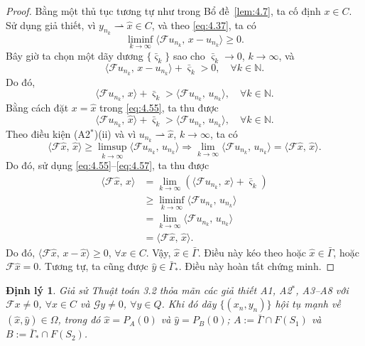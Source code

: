 \documentclass[11pt,a4paper]{article}
\theoremstyle{plain}
\newtheorem{theorem}{Định lý}[section]
\theoremstyle{definition}
\theoremstyle{remark}
\numberwithin{equation}{section}
\newcommand{\Fc}{\mathcal{F}}
\newcommand{\Gc}{\mathcal{G}}
\newcommand{\inp}[2]{\langle #1,\,#2\rangle}
\newcommand{\wto}{\rightharpoonup}
\newcommand{\N}{\mathbb{N}}
\newcommand{\Gam}{\bar{\Gamma}}
\newcommand{\Gams}{\bar{\Gamma}_{*}}
\newcommand{\Fix}[1]{F(#1)}
\begin{document}
\begin{proof}
Bằng một thủ tục tương tự như trong Bổ đề~\ref{lem:4.7}, ta cố định $x\in C$. Sử dụng giả thiết, vì $y_{n_k}\wto\hat{x}\in C$, và theo \eqref{eq:4.37}, ta có
\[
\liminf_{k\to\infty}\inp{\Fc u_{n_k}}{x-u_{n_k}}\ge 0.
\]
Bây giờ ta chọn một dãy dương $\{\bar{\varsigma}_k\}$ sao cho $\bar{\varsigma}_k\to 0$, $k\to\infty$, và
\[
\inp{\Fc u_{n_k}}{x-u_{n_k}}+\bar{\varsigma}_k>0,\quad\forall k\in\N.
\]
Do đó,
\begin{equation}
\inp{\Fc u_{n_k}}{x}+\bar{\varsigma}_k>\inp{\Fc u_{n_k}}{u_{n_k}},\quad\forall k\in\N. \label{eq:4.55}
\end{equation}
Bằng cách đặt $x=\hat{x}$ trong \eqref{eq:4.55}, ta thu được
\begin{equation}
\inp{\Fc u_{n_k}}{\hat{x}}+\bar{\varsigma}_k>\inp{\Fc u_{n_k}}{u_{n_k}},\quad\forall k\in\N. \label{eq:4.56}
\end{equation}
Theo điều kiện (A2$^{*}$)(ii) và vì $u_{n_k}\wto\hat{x}$, $k\to\infty$, ta có
\begin{equation}
\inp{\Fc\hat{x}}{\hat{x}}\ge\limsup_{k\to\infty}\inp{\Fc u_{n_k}}{u_{n_k}}\Longrightarrow\lim_{k\to\infty}\inp{\Fc u_{n_k}}{u_{n_k}}=\inp{\Fc\hat{x}}{\hat{x}}. \label{eq:4.57}
\end{equation}
Do đó, sử dụng \eqref{eq:4.55}--\eqref{eq:4.57}, ta thu được
\begin{align*}
\inp{\Fc\hat{x}}{x} &= \lim_{k\to\infty}(\inp{\Fc u_{n_k}}{x}+\bar{\varsigma}_k)\\
&\ge \liminf_{k\to\infty}\inp{\Fc u_{n_k}}{u_{n_k}}\\
&= \lim_{k\to\infty}\inp{\Fc u_{n_k}}{u_{n_k}}\\
&= \inp{\Fc\hat{x}}{\hat{x}}.
\end{align*}
Do đó, $\inp{\Fc\hat{x}}{x-\hat{x}}\ge 0$, $\forall x\in C$. Vậy, $\hat{x}\in\Gam$. Điều này kéo theo hoặc $\hat{x}\in\Gam$, hoặc $\Fc\hat{x}=0$. Tương tự, ta cũng được $\hat{y}\in\Gams$. Điều này hoàn tất chứng minh.
\end{proof}

\begin{theorem}\label{thm:4.12}
Giả sử Thuật toán 3.2 thỏa mãn các giả thiết A1, A2$^{*}$, A3--A8 với $\Fc x\ne 0$, $\forall x\in C$ và $\Gc y\ne 0$, $\forall y\in Q$. Khi đó dãy $\{(x_n,y_n)\}$ hội tụ mạnh về $(\hat{x},\hat{y})\in\Omega$, trong đó $\hat{x}=P_A(0)$ và $\hat{y}=P_B(0)$; $A:=\Gam\cap \Fix{S_1}$ và $B:=\Gams\cap \Fix{S_2}$.
\end{theorem}
\end{document}
